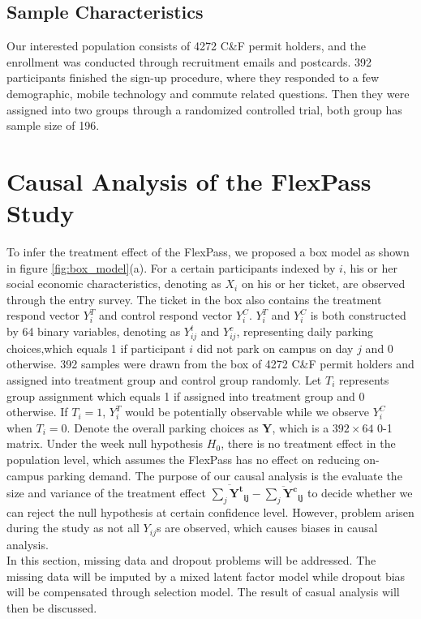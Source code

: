 \documentclass[preprint,12pt]{elsarticle}
\begin{document}
\subsection{Sample Characteristics}

Our interested population consists of 4272 C\&F permit holders, and the enrollment was conducted through recruitment emails and postcards. 392 participants finished the sign-up procedure, where they responded to a few demographic, mobile technology and commute related questions. Then they were assigned into two groups through a randomized controlled trial, both group has sample size of 196. 

\section{Causal Analysis of the FlexPass Study}
To infer the treatment effect of the FlexPass, we proposed a box model as shown in figure \ref{fig:box_model}(a). For a certain participants indexed by $i$, his or her social economic characteristics, denoting as $X_i$ on his or her ticket, are observed through the entry survey. The ticket in the box also contains the treatment respond vector $Y_i^T$ and control respond vector $Y_i^C$. $Y_i^T$ and $Y_i^C$ is both constructed by 64 binary variables, denoting as $Y_{ij}^t$ and $Y_{ij}^c$, representing daily parking choices,which equals 1 if participant $i$ did not park on campus on day $j$ and 0 otherwise. 392 samples were drawn from the box of 4272 C\&F permit holders and assigned into treatment group and control group randomly. Let $T_i$ represents group assignment which equals 1 if assigned into treatment group and 0 otherwise. If $T_i=1$, $Y_i^T$ would be potentially observable while we observe $Y_i^C$ when $T_i=0$. Denote the overall parking choices as $\mathbf{Y}$, which is a $392\times 64$ 0-1 matrix. Under the week null hypothesis $H_0$, there is no treatment effect in the population level, which assumes the FlexPass has no effect on reducing on-campus parking demand. The purpose of our causal analysis is the evaluate the size and variance of the treatment effect $\overline {\sum\limits_j \mathbf{{{Y^t}_{ij}}} }  - \overline {\sum\limits_j \mathbf{{{Y^c}_{ij}}} } $ to decide whether we can reject the null hypothesis at certain confidence level. However, problem arisen during the study as not all $Y_{ij}$s are observed, which causes biases in causal analysis. \\

In this section, missing data and dropout problems will be addressed. The missing data will be imputed by a mixed latent factor model while dropout bias will be compensated through selection model. The result of casual analysis will then be discussed.    
\end{document}
